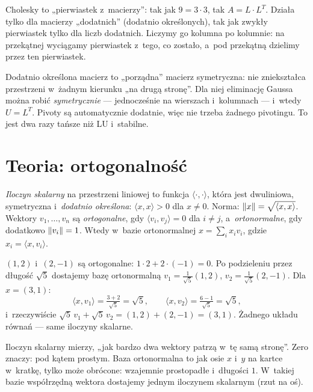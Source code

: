 \documentclass[11pt]{article}
\begin{document}
\begin{poludzku}
Cholesky to „pierwiastek z~macierzy”: tak jak $9=3\cdot3$, tak
$A=L\cdot L^T$. Działa tylko dla macierzy „dodatnich” (dodatnio
określonych), tak jak zwykły pierwiastek tylko dla liczb dodatnich.
Liczymy go kolumna po kolumnie: na przekątnej wyciągamy pierwiastek
z~tego, co zostało, a~pod przekątną dzielimy przez ten pierwiastek.
\end{poludzku}

\begin{intuicja}
Dodatnio określona macierz to „porządna” macierz symetryczna: nie
zniekształca przestrzeni w~żadnym kierunku „na drugą stronę”. Dla niej
eliminację Gaussa można robić \emph{symetrycznie} --- jednocześnie na
wierszach i~kolumnach --- i~wtedy $U=L^T$. Pivoty są automatycznie dodatnie,
więc nie trzeba żadnego pivotingu. To jest dwa razy tańsze niż LU i~stabilne.
\end{intuicja}

\section{Teoria: ortogonalność}

\begin{definicja}
\emph{Iloczyn skalarny} na przestrzeni liniowej to funkcja
$\langle\cdot,\cdot\rangle$, która jest dwuliniowa, symetryczna
i~\emph{dodatnio określona}: $\langle x,x\rangle>0$ dla $x\ne0$.
Norma: $\left\lVert x \right\rVert=\sqrt{\langle x,x\rangle}$. Wektory $v_1,\ldots,v_n$ są
\emph{ortogonalne}, gdy $\langle v_i,v_j\rangle=0$ dla $i\ne j$,
a~\emph{ortonormalne}, gdy dodatkowo $\left\lVert v_i \right\rVert=1$. Wtedy w~bazie
ortonormalnej $x=\sum_ix_iv_i$, gdzie $x_i=\langle x,v_i\rangle$.
\end{definicja}

\begin{przyklad}
$(1,2)$ i~$(2,-1)$ są ortogonalne: $1\cdot2+2\cdot(-1)=0$. Po podzieleniu
przez długość $\sqrt5$ dostajemy bazę ortonormalną
$v_1=\tfrac1{\sqrt5}(1,2)$, $v_2=\tfrac1{\sqrt5}(2,-1)$. Dla $x=(3,1)$:
\[
\langle x,v_1\rangle=\tfrac{3+2}{\sqrt5}=\sqrt5,\qquad
\langle x,v_2\rangle=\tfrac{6-1}{\sqrt5}=\sqrt5,
\]
i~rzeczywiście $\sqrt5\,v_1+\sqrt5\,v_2=(1,2)+(2,-1)=(3,1)$. Żadnego
układu równań --- same iloczyny skalarne.
\end{przyklad}

\begin{poludzku}
Iloczyn skalarny mierzy, „jak bardzo dwa wektory patrzą w~tę samą
stronę”. Zero znaczy: pod kątem prostym. Baza ortonormalna to jak osie
$x$ i~$y$ na kartce w~kratkę, tylko może obrócone: wzajemnie prostopadłe
i~długości $1$. W~takiej bazie współrzędną wektora dostajemy jednym
iloczynem skalarnym (rzut na oś).
\end{poludzku}
\end{document}
